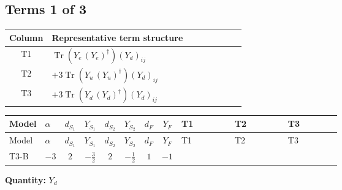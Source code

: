 \documentclass[8pt]{article}
\begin{document}
\begin{landscape}
\subsection*{Terms 1 of 3}
\begin{center}
\begin{tabular}{@{}c >{\raggedright\arraybackslash}p{0.82\linewidth}@{}}
\toprule
Column & Representative term structure \\
\midrule
T1 & \(\displaystyle \operatorname{Tr}\!\left({Y_e}\,\left({Y_e}\right)^{\dagger}\right) \left({Y_d}\right)_{ij}\) \\
\midrule
T2 & \(\displaystyle +3 \operatorname{Tr}\!\left({Y_u}\,\left({Y_u}\right)^{\dagger}\right) \left({Y_d}\right)_{ij}\) \\
\midrule
T3 & \(\displaystyle +3 \operatorname{Tr}\!\left({Y_d}\,\left({Y_d}\right)^{\dagger}\right) \left({Y_d}\right)_{ij}\) \\
\midrule
\bottomrule
\end{tabular}
\end{center}
\smallskip
\tiny
\begin{longtable}{@{}llcccccc >{\raggedright\arraybackslash}p{0.21\linewidth} >{\raggedright\arraybackslash}p{0.21\linewidth} >{\raggedright\arraybackslash}p{0.21\linewidth}@{}}
\toprule
Model & $\alpha$ & $d_{S_1}$ & $Y_{S_1}$ & $d_{S_2}$ & $Y_{S_2}$ & $d_F$ & $Y_F$ & T1 & T2 & T3 \\
\midrule
\endfirsthead
\toprule
Model & $\alpha$ & $d_{S_1}$ & $Y_{S_1}$ & $d_{S_2}$ & $Y_{S_2}$ & $d_F$ & $Y_F$ & T1 & T2 & T3 \\
\midrule
\endhead
T3-B & $-3$ & $2$ & $-\frac{3}{2}$ & $2$ & $-\frac{1}{2}$ & $1$ & $-1$ & \scriptsize\adjustbox{max width=\linewidth}{$\begin{gathered} \operatorname{Tr}\!\left({Y_e}\,\left({Y_e}\right)^{\dagger}\right) \left({Y_d}\right)_{ij}\end{gathered}$} & \scriptsize\adjustbox{max width=\linewidth}{$\begin{gathered} +3 \operatorname{Tr}\!\left({Y_u}\,\left({Y_u}\right)^{\dagger}\right) \left({Y_d}\right)_{ij}\end{gathered}$} & \scriptsize\adjustbox{max width=\linewidth}{$\begin{gathered} +3 \operatorname{Tr}\!\left({Y_d}\,\left({Y_d}\right)^{\dagger}\right) \left({Y_d}\right)_{ij}\end{gathered}$} \\
\midrule
\bottomrule
\end{longtable}
\clearpage
\noindent\textbf{Quantity: }$Y_d$\par\smallskip

\end{landscape}
\end{document}
